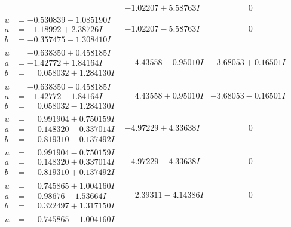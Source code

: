 \documentclass[1p]{elsarticle_modified}
\theoremstyle{definition}
\begin{document}
$$\begin{array}{c|c|c}
 & -1.02207 + 5.58763 I & \phantom{-0.000000 } 0 \\ \hline\begin{aligned}
u &= -0.530839 - 1.085190 I \\
a &= -1.18992 + 2.38726 I \\
b &= -0.357475 - 1.308410 I\end{aligned}
 & -1.02207 - 5.58763 I & \phantom{-0.000000 } 0 \\ \hline\begin{aligned}
u &= -0.638350 + 0.458185 I \\
a &= -1.42772 + 1.84164 I \\
b &= \phantom{-}0.058032 + 1.284130 I\end{aligned}
 & \phantom{-}4.43558 - 0.95010 I & -3.68053 + 0.16501 I \\ \hline\begin{aligned}
u &= -0.638350 - 0.458185 I \\
a &= -1.42772 - 1.84164 I \\
b &= \phantom{-}0.058032 - 1.284130 I\end{aligned}
 & \phantom{-}4.43558 + 0.95010 I & -3.68053 - 0.16501 I \\ \hline\begin{aligned}
u &= \phantom{-}0.991904 + 0.750159 I \\
a &= \phantom{-}0.148320 - 0.337014 I \\
b &= \phantom{-}0.819310 - 0.137492 I\end{aligned}
 & -4.97229 + 4.33638 I & \phantom{-0.000000 } 0 \\ \hline\begin{aligned}
u &= \phantom{-}0.991904 - 0.750159 I \\
a &= \phantom{-}0.148320 + 0.337014 I \\
b &= \phantom{-}0.819310 + 0.137492 I\end{aligned}
 & -4.97229 - 4.33638 I & \phantom{-0.000000 } 0 \\ \hline\begin{aligned}
u &= \phantom{-}0.745865 + 1.004160 I \\
a &= \phantom{-}0.98676 - 1.53664 I \\
b &= \phantom{-}0.322497 + 1.317150 I\end{aligned}
 & \phantom{-}2.39311 - 4.14386 I & \phantom{-0.000000 } 0 \\ \hline\begin{aligned}
u &= \phantom{-}0.745865 - 1.004160 I \\

\end{aligned}
\end{array}$$
\end{document}

